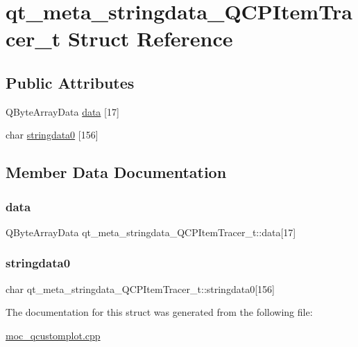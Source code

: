 \hypertarget{structqt__meta__stringdata__QCPItemTracer__t}{}\section{qt\+\_\+meta\+\_\+stringdata\+\_\+\+Q\+C\+P\+Item\+Tracer\+\_\+t Struct Reference}
\label{structqt__meta__stringdata__QCPItemTracer__t}
\subsection*{Public Attributes}
\begin{DoxyCompactItemize}
\item 
Q\+Byte\+Array\+Data \mbox{\hyperlink{structqt__meta__stringdata__QCPItemTracer__t_a22eae99e6c4a456148200505b43289b8}{data}} \mbox{[}17\mbox{]}
\item 
char \mbox{\hyperlink{structqt__meta__stringdata__QCPItemTracer__t_a716a4a42fdc434d4a1e9e7b141e3715d}{stringdata0}} \mbox{[}156\mbox{]}
\end{DoxyCompactItemize}


\subsection{Member Data Documentation}
\mbox{\label{structqt__meta__stringdata__QCPItemTracer__t_a22eae99e6c4a456148200505b43289b8}} 
\subsubsection{\texorpdfstring{data}{data}}
{\footnotesize\ttfamily Q\+Byte\+Array\+Data qt\+\_\+meta\+\_\+stringdata\+\_\+\+Q\+C\+P\+Item\+Tracer\+\_\+t\+::data\mbox{[}17\mbox{]}}

\mbox{\label{structqt__meta__stringdata__QCPItemTracer__t_a716a4a42fdc434d4a1e9e7b141e3715d}} 
\subsubsection{\texorpdfstring{stringdata0}{stringdata0}}
{\footnotesize\ttfamily char qt\+\_\+meta\+\_\+stringdata\+\_\+\+Q\+C\+P\+Item\+Tracer\+\_\+t\+::stringdata0\mbox{[}156\mbox{]}}



The documentation for this struct was generated from the following file\+:\begin{DoxyCompactItemize}
\item 
\mbox{\hyperlink{moc__qcustomplot_8cpp}{moc\+\_\+qcustomplot.\+cpp}}\end{DoxyCompactItemize}
